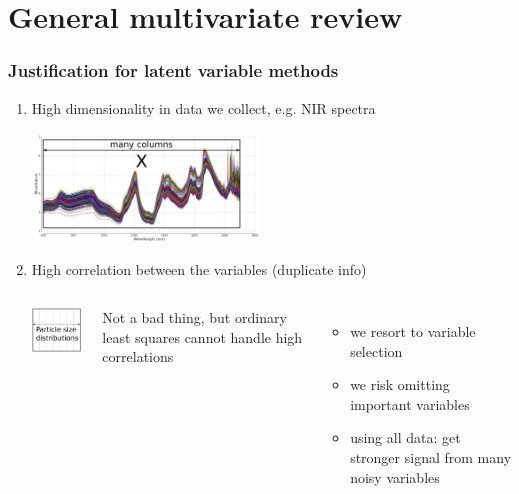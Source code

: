 \documentclass[handout, 12pt]{beamer}
\begin{document}
\section{General multivariate review}

\begin{frame}\frametitle{Justification for latent variable methods}

\begin{enumerate}
	\item	High dimensionality in data we collect, e.g. NIR spectra
			\begin{center}
				\includegraphics[width=6cm]{images/high-dimensionality-data.jpg}
			\end{center}
			
			
	\item	High correlation between the variables (duplicate info)
			\vspace{6pt}
			\begin{columns}
				\begin{center}
					\includegraphics[width=3cm]{images/high-correlation-between-variables.png}
				\end{center}
				
				Not a bad thing, but ordinary least squares cannot handle high correlations
				\begin{itemize}
					\item	we resort to variable selection					
					\item	we risk omitting important variables
					\item	using all data: get stronger signal from many noisy variables
				\end{itemize}
				
			\end{columns}
			
\end{enumerate}
\end{frame}
\end{document}
